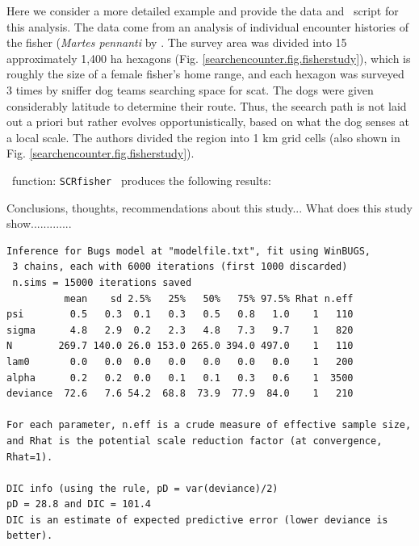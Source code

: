 Here we consider a more detailed example and provide the data and
\R~script for this analysis.  The data come from an analysis of
individual encounter histories of the fisher ({\it Martes pennanti} by
\citet{thompson_etal:2012}.  The survey area was divided into 15
approximately 1,400 ha hexagons
(Fig. \ref{searchencounter.fig.fisherstudy}), which is roughly the
size of a female fisher's home range, and each hexagon was surveyed 3
times by sniffer dog teams searching space for scat. The dogs were
given considerably latitude to determine their route.  Thus, the
seearch path is not laid out a priori but rather evolves
opportunistically, based on what the dog senses at a local scale.  The
authors divided the region into 1 km grid cells (also shown in Fig.
\ref{searchencounter.fig.fisherstudy}).

\R~function: \mbox{\tt SCRfisher  } produces the following results:

Conclusions, thoughts, recommendations about this study...
What does this study show.............


{\small
\begin{verbatim}
Inference for Bugs model at "modelfile.txt", fit using WinBUGS,
 3 chains, each with 6000 iterations (first 1000 discarded)
 n.sims = 15000 iterations saved
          mean    sd 2.5%   25%   50%   75% 97.5% Rhat n.eff
psi        0.5   0.3  0.1   0.3   0.5   0.8   1.0    1   110
sigma      4.8   2.9  0.2   2.3   4.8   7.3   9.7    1   820
N        269.7 140.0 26.0 153.0 265.0 394.0 497.0    1   110
lam0       0.0   0.0  0.0   0.0   0.0   0.0   0.0    1   200
alpha      0.2   0.2  0.0   0.1   0.1   0.3   0.6    1  3500
deviance  72.6   7.6 54.2  68.8  73.9  77.9  84.0    1   210

For each parameter, n.eff is a crude measure of effective sample size,
and Rhat is the potential scale reduction factor (at convergence, Rhat=1).

DIC info (using the rule, pD = var(deviance)/2)
pD = 28.8 and DIC = 101.4
DIC is an estimate of expected predictive error (lower deviance is better).
\end{verbatim}
}



